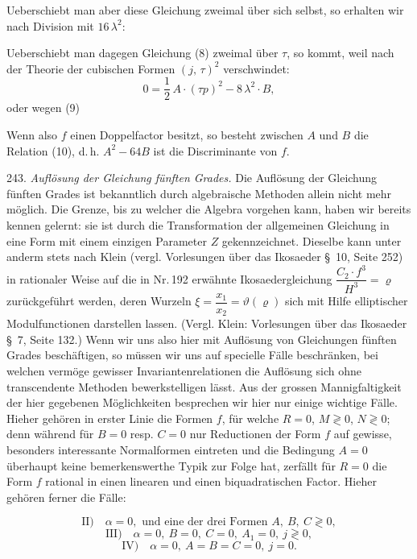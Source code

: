 Ueberschiebt man aber diese Gleichung zweimal \"uber sich selbst, so erhalten wir nach Division mit $16\,\lambda^2$:

Ueberschiebt man dagegen Gleichung (8) zweimal \"uber $\tau$, so kommt, weil nach der Theorie der cubischen Formen $(j,\,\tau)^2$ verschwindet:
\[
0 = \frac{1}{2}\,A\cdot(\tau p)^2 - 8\,\lambda^2\cdot B,
\]
oder wegen (9)

Wenn also $f$ einen Doppelfactor besitzt, so besteht zwischen $A$ und $B$ die Relation (10), d.\,h. $A^2-64B$ ist die Discriminante von $f$.

243. \textit{Aufl\"osung der Gleichung f\"unften Grades.} Die Aufl\"osung der Gleichung f\"unften Grades ist bekanntlich durch algebraische Methoden allein nicht mehr m\"oglich. Die Grenze, bis zu welcher die Algebra vorgehen kann, haben wir bereits kennen gelernt: sie ist durch die Transformation der allgemeinen Gleichung in eine Form mit einem einzigen Parameter $Z$ gekennzeichnet. Dieselbe kann unter anderm stets nach Klein (vergl. \glqq Vorlesungen \"uber das Ikosaeder\grqq{} \S~10, Seite 252) in rationaler Weise auf die in Nr.\,192 erw\"ahnte Ikosaedergleichung $\dfrac{C_2\cdot f^3}{H^3} = \varrho$ zur\"uckgef\"uhrt werden, deren Wurzeln $\xi = \dfrac{x_1}{x_2} = \vartheta(\varrho)$ sich mit Hilfe elliptischer Modulfunctionen darstellen lassen. (Vergl. Klein: \glqq Vorlesungen \"uber das Ikosaeder\grqq{} \S~7, Seite 132.) Wenn wir uns also hier mit Aufl\"osung von Gleichungen f\"unften Grades besch\"aftigen, so m\"ussen wir uns auf specielle F\"alle beschr\"anken, bei welchen verm\"oge gewisser Invariantenrelationen die Aufl\"osung sich ohne transcendente Methoden bewerkstelligen l\"asst. Aus der grossen Mannigfaltigkeit der hier gegebenen M\"oglichkeiten besprechen wir hier nur einige wichtige F\"alle. Hieher geh\"oren in erster Linie die Formen $f$, f\"ur welche $R=0$, $M\gtrless 0$, $N\gtrless 0$; denn w\"ahrend f\"ur $B=0$ resp. $C=0$ nur Reductionen der Form $f$ auf gewisse, besonders interessante Normalformen eintreten und die Bedingung $A=0$ \"uberhaupt keine bemerkenswerthe Typik zur Folge hat, zerf\"allt f\"ur $R=0$ die Form $f$ rational in einen linearen und einen biquadratischen Factor. Hieher geh\"oren ferner die F\"alle:


\[
\text{II)}\quad \alpha = 0, \text{ und eine der drei Formen } A,\ B,\ C\gtrless 0,
\]
\[
\text{III)}\quad \alpha = 0,\ B=0,\ C=0,\ A_1=0,\ j\gtrless 0,
\]
\[
\text{IV)}\quad \alpha = 0,\ A=B=C=0,\ j=0.
\]


